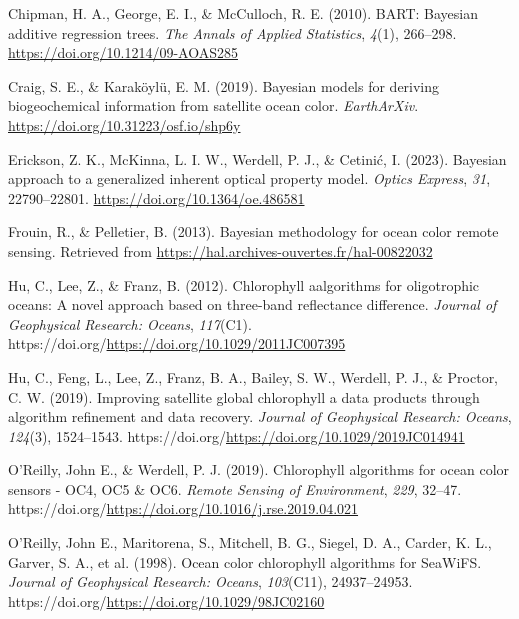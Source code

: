 \documentclass[
]{agujournal2019}
\newlength{\cslhangindent}
\newenvironment{CSLReferences}[2] %
 {\begin{list}{}{%
  \setlength{\itemindent}{0pt}
  \setlength{\leftmargin}{0pt}
  \setlength{\parsep}{0pt}
  \ifodd #1
   \setlength{\leftmargin}{\cslhangindent}
   \setlength{\itemindent}{-1\cslhangindent}
  \fi
  \setlength{\itemsep}{#2\baselineskip}}}
 {\end{list}}
\begin{document}
\label{refs}
\begin{CSLReferences}{1}{0}
\vspace{1em}

Chipman, H. A., George, E. I., \& McCulloch, R. E. (2010). BART:
Bayesian additive regression trees. \emph{The Annals of Applied
Statistics}, \emph{4}(1), 266--298.
\url{https://doi.org/10.1214/09-AOAS285}

Craig, S. E., \& Karaköylü, E. M. (2019). Bayesian models for deriving
biogeochemical information from satellite ocean color.
\emph{EarthArXiv}. \url{https://doi.org/10.31223/osf.io/shp6y}

Erickson, Z. K., McKinna, L. I. W., Werdell, P. J., \& Cetinić, I.
(2023). Bayesian approach to a generalized inherent optical property
model. \emph{Optics Express}, \emph{31}, 22790--22801.
\url{https://doi.org/10.1364/oe.486581}

Frouin, R., \& Pelletier, B. (2013). Bayesian methodology for ocean
color remote sensing. Retrieved from
\url{https://hal.archives-ouvertes.fr/hal-00822032}

Hu, C., Lee, Z., \& Franz, B. (2012). Chlorophyll aalgorithms for
oligotrophic oceans: A novel approach based on three-band reflectance
difference. \emph{Journal of Geophysical Research: Oceans},
\emph{117}(C1).
https://doi.org/\url{https://doi.org/10.1029/2011JC007395}

Hu, C., Feng, L., Lee, Z., Franz, B. A., Bailey, S. W., Werdell, P. J.,
\& Proctor, C. W. (2019). Improving satellite global chlorophyll a data
products through algorithm refinement and data recovery. \emph{Journal
of Geophysical Research: Oceans}, \emph{124}(3), 1524--1543.
https://doi.org/\url{https://doi.org/10.1029/2019JC014941}

O'Reilly, John E., \& Werdell, P. J. (2019). Chlorophyll algorithms for
ocean color sensors - OC4, OC5 \& OC6. \emph{Remote Sensing of
Environment}, \emph{229}, 32--47.
https://doi.org/\url{https://doi.org/10.1016/j.rse.2019.04.021}

O'Reilly, John E., Maritorena, S., Mitchell, B. G., Siegel, D. A.,
Carder, K. L., Garver, S. A., et al. (1998). Ocean color chlorophyll
algorithms for SeaWiFS. \emph{Journal of Geophysical Research: Oceans},
\emph{103}(C11), 24937--24953.
https://doi.org/\url{https://doi.org/10.1029/98JC02160}


\end{CSLReferences}
\end{document}
